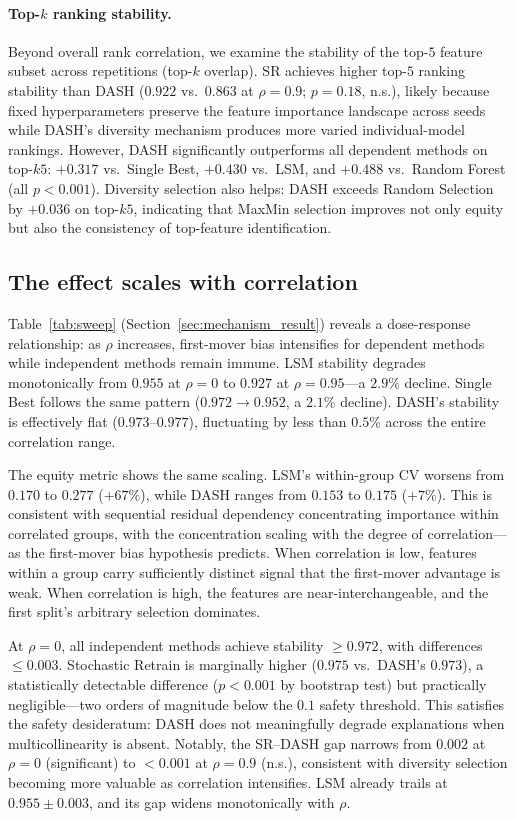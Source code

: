 \documentclass[11pt]{article}
\newcommand{\dash}{\textsc{DASH}}
\newcommand{\rhovar}{\rho}
\begin{document}
\paragraph{Top-$k$ ranking stability.}
Beyond overall rank correlation, we examine the stability of the top-$5$
feature subset across repetitions (top-$k$ overlap). SR achieves higher
top-$5$ ranking stability than \dash{} ($0.922$ vs.\ $0.863$ at
$\rhovar = 0.9$; $p = 0.18$, n.s.), likely because fixed hyperparameters
preserve the feature importance landscape across seeds while \dash{}'s
diversity mechanism produces more varied individual-model rankings.
However, \dash{} significantly outperforms all dependent methods on
top-$k5$: $+0.317$ vs.\ Single Best, $+0.430$ vs.\ LSM, and $+0.488$
vs.\ Random Forest (all $p < 0.001$). Diversity selection also helps:
\dash{} exceeds Random Selection by $+0.036$ on top-$k5$, indicating
that MaxMin selection improves not only equity but also the consistency
of top-feature identification.

\subsection{The effect scales with correlation}
\label{sec:scaling}

Table~\ref{tab:sweep} (Section~\ref{sec:mechanism_result}) reveals a
dose-response relationship: as $\rhovar$ increases, first-mover bias
intensifies for dependent methods while independent methods remain
immune. LSM stability degrades monotonically from $0.955$ at $\rhovar=0$
to $0.927$ at $\rhovar=0.95$---a $2.9\%$ decline. Single Best follows
the same pattern ($0.972 \to 0.952$, a $2.1\%$ decline). \dash{}'s
stability is effectively flat ($0.973$--$0.977$), fluctuating by less
than $0.5\%$ across the entire correlation range.

The equity metric shows the same scaling. LSM's within-group CV worsens
from $0.170$ to $0.277$ ($+67\%$), while \dash{} ranges from $0.153$ to
$0.175$ ($+7\%$). This is consistent with sequential residual dependency
concentrating importance within correlated groups, with the concentration
scaling with the degree of correlation---as the first-mover bias
hypothesis predicts. When correlation is low, features within a group
carry sufficiently distinct signal that the first-mover advantage is
weak. When correlation is high, the features are near-interchangeable,
and the first split's arbitrary selection dominates.

At $\rhovar = 0$, all independent methods achieve stability $\geq 0.972$,
with differences $\leq 0.003$. Stochastic Retrain is marginally higher
($0.975$ vs.\ \dash{}'s $0.973$), a statistically detectable difference
($p < 0.001$ by bootstrap test) but practically negligible---two orders
of magnitude below the $0.1$ safety threshold. This satisfies the safety
desideratum: \dash{} does not meaningfully degrade explanations when
multicollinearity is absent. Notably, the SR--\dash{} gap narrows from
$0.002$ at $\rhovar = 0$ (significant) to $< 0.001$ at $\rhovar = 0.9$
(n.s.), consistent with diversity selection becoming more valuable as
correlation intensifies.
LSM already trails at $0.955 \pm 0.003$, and its gap widens monotonically
with $\rhovar$.
\end{document}
